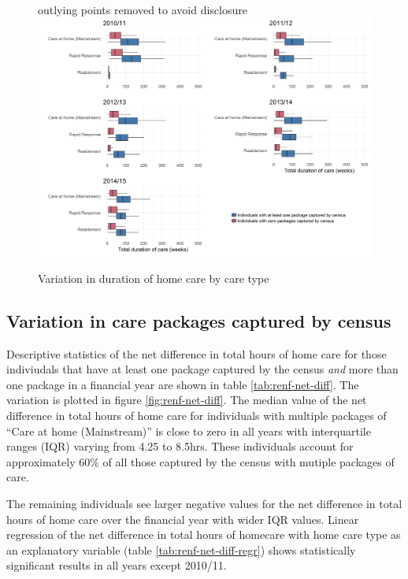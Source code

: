 \documentclass[]{article}
\begin{document}
\begin{figure}[]
  \centering
    \caption{Variation in duration of home care by care type}
    {\scriptsize outlying points removed to avoid disclosure}
    \includegraphics{figures/chapter-renf/19-dur-type-plot.png}
    \label{fig:renf-dur-type}
\end{figure}

\FloatBarrier
\subsection{Variation in care packages captured by census}\label{subsec:renf-census-variation}

Descriptive statistics of the net difference in total hours of home care
for those indiviudals that have at least one package captured by the
census \emph{and} more than one package in a financial year are shown in
table \ref{tab:renf-net-diff}. The variation is plotted in figure
\ref{fig:renf-net-diff}. The median value of the net difference in total
hours of home care for individuals with multiple packages of ``Care at
home (Mainstream)'' is close to zero in all years with interquartile
ranges (IQR) varying from 4.25 to 8.5hrs. These individuals account for
approximately 60\% of all those captured by the census with mutiple
packages of care.

The remaining individuals see larger negative values for the net
difference in total hours of home care over the financial year with
wider IQR values. Linear regression of the net difference in total hours
of homecare with home care type as an explanatory variable (table
\ref{tab:renf-net-diff-regr}) shows statistically significant results in
all years except 2010/11.
\end{document}
